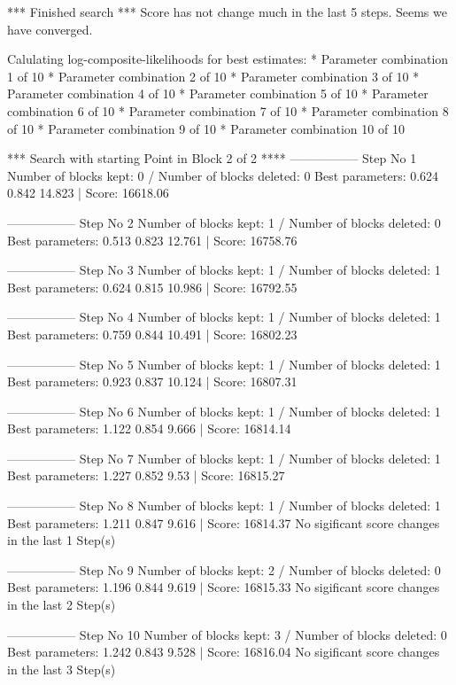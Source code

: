 \begin{Schunk}
\begin{Soutput}
*** Finished search *** 
Score has not change much in the last 5 steps. 
Seems we have converged. 

Calulating log-composite-likelihoods for best estimates: 
* Parameter combination 1 of 10 
* Parameter combination 2 of 10 
* Parameter combination 3 of 10 
* Parameter combination 4 of 10 
* Parameter combination 5 of 10 
* Parameter combination 6 of 10 
* Parameter combination 7 of 10 
* Parameter combination 8 of 10 
* Parameter combination 9 of 10 
* Parameter combination 10 of 10 

*** Search with starting Point in Block 2 of 2 **** 
----------------- 
Step No 1 
Number of blocks kept: 0  / Number of blocks deleted: 0 
Best parameters:  0.624 0.842 14.823 | Score: 16618.06 

----------------- 
Step No 2 
Number of blocks kept: 1  / Number of blocks deleted: 0 
Best parameters:  0.513 0.823 12.761 | Score: 16758.76 

----------------- 
Step No 3 
Number of blocks kept: 1  / Number of blocks deleted: 1 
Best parameters:  0.624 0.815 10.986 | Score: 16792.55 

----------------- 
Step No 4 
Number of blocks kept: 1  / Number of blocks deleted: 1 
Best parameters:  0.759 0.844 10.491 | Score: 16802.23 

----------------- 
Step No 5 
Number of blocks kept: 1  / Number of blocks deleted: 1 
Best parameters:  0.923 0.837 10.124 | Score: 16807.31 

----------------- 
Step No 6 
Number of blocks kept: 1  / Number of blocks deleted: 1 
Best parameters:  1.122 0.854 9.666 | Score: 16814.14 

----------------- 
Step No 7 
Number of blocks kept: 1  / Number of blocks deleted: 1 
Best parameters:  1.227 0.852 9.53 | Score: 16815.27 

----------------- 
Step No 8 
Number of blocks kept: 1  / Number of blocks deleted: 1 
Best parameters:  1.211 0.847 9.616 | Score: 16814.37 
No sigificant score changes in the last 1 Step(s) 

----------------- 
Step No 9 
Number of blocks kept: 2  / Number of blocks deleted: 0 
Best parameters:  1.196 0.844 9.619 | Score: 16815.33 
No sigificant score changes in the last 2 Step(s) 

----------------- 
Step No 10 
Number of blocks kept: 3  / Number of blocks deleted: 0 
Best parameters:  1.242 0.843 9.528 | Score: 16816.04 
No sigificant score changes in the last 3 Step(s) 


\end{Soutput}
\end{Schunk}
